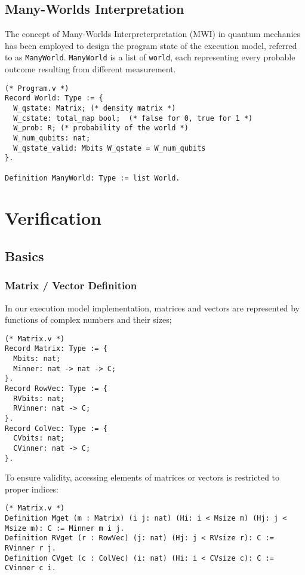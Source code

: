 \documentclass[10pt,a4paper]{article}
\newcommand{\<}{\langle}
\renewcommand{\>}{\rangle}
\begin{document}
\subsection{Many-Worlds Interpretation}
The concept of Many-Worlds Interpreterpretation (MWI) in quantum mechanics has been employed to
design the program state of the execution model, referred to as \texttt{ManyWorld}.
\texttt{ManyWorld} is a list of \texttt{world}, each representing every probable
outcome resulting from different measurement.
\begin{lstlisting}
(* Program.v *)
Record World: Type := {
  W_qstate: Matrix; (* density matrix *)
  W_cstate: total_map bool;  (* false for 0, true for 1 *)
  W_prob: R; (* probability of the world *)
  W_num_qubits: nat;
  W_qstate_valid: Mbits W_qstate = W_num_qubits
}.

Definition ManyWorld: Type := list World.
\end{lstlisting}

\section{Verification}
\subsection{Basics}
\subsubsection{Matrix / Vector Definition}
In our execution model implementation, matrices and vectors are represented by
functions of complex numbers and their sizes;

\begin{lstlisting}
(* Matrix.v *)
Record Matrix: Type := {
  Mbits: nat;
  Minner: nat -> nat -> C;
}.
Record RowVec: Type := {
  RVbits: nat;
  RVinner: nat -> C;
}.
Record ColVec: Type := {
  CVbits: nat;
  CVinner: nat -> C;
}.
\end{lstlisting}

To ensure validity, accessing elements of matrices or vectors is restricted to
proper indices:

\begin{lstlisting}
(* Matrix.v *)
Definition Mget (m : Matrix) (i j: nat) (Hi: i < Msize m) (Hj: j < Msize m): C := Minner m i j.
Definition RVget (r : RowVec) (j: nat) (Hj: j < RVsize r): C := RVinner r j.
Definition CVget (c : ColVec) (i: nat) (Hi: i < CVsize c): C := CVinner c i.
\end{lstlisting}
\end{document}
